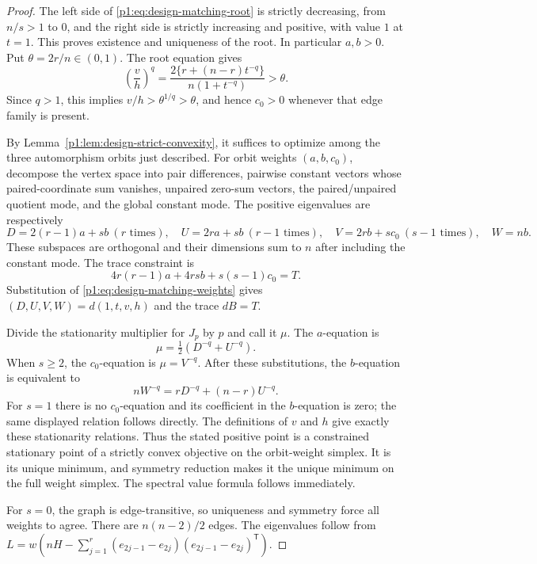 \documentclass[11pt,a4paper]{article}
\theoremstyle{definition}
\theoremstyle{remark}
\numberwithin{equation}{section}
\begin{document}
\begin{proof}
The left side of \eqref{p1:eq:design-matching-root} is strictly decreasing,
from $n/s>1$ to $0$, and the right side is strictly increasing and
positive, with value $1$ at $t=1$.  This proves existence and uniqueness
of the root.  In particular $a,b>0$.
Put $\theta=2r/n\in(0,1)$.  The root equation gives
\[
 \left(\frac vh\right)^q
 =\frac{2\{r+(n-r)t^{-q}\}}{n(1+t^{-q})}>\theta.
\]
Since $q>1$, this implies $v/h>\theta^{1/q}>\theta$,
and hence $c_0>0$ whenever that edge family is present.

By Lemma~\ref{p1:lem:design-strict-convexity}, it suffices to optimize among
the three automorphism orbits just described.  For orbit weights
$(a,b,c_0)$, decompose the vertex space into pair differences, pairwise
constant vectors whose paired-coordinate sum vanishes, unpaired zero-sum
vectors, the paired/unpaired quotient mode, and the global constant mode.
The positive eigenvalues are respectively
\[
 D=2(r-1)a+sb\ (r\text{ times}),\quad
 U=2ra+sb\ (r-1\text{ times}),\quad
 V=2rb+sc_0\ (s-1\text{ times}),\quad W=nb.
\]
These subspaces are orthogonal and their dimensions sum to $n$ after
including the constant mode.  The trace constraint is
\begin{equation}\label{p1:eq:design-matching-trace}
 4r(r-1)a+4rsb+s(s-1)c_0=T.
\end{equation}
Substitution of \eqref{p1:eq:design-matching-weights} gives
$(D,U,V,W)=d(1,t,v,h)$ and the trace $dB=T$.

Divide the stationarity multiplier for $J_p$ by $p$ and call it $\mu$.
The $a$-equation is
\[
 \mu=\tfrac12(D^{-q}+U^{-q}).
\]
When $s\ge2$, the $c_0$-equation is $\mu=V^{-q}$.
After these substitutions, the $b$-equation is equivalent to
\begin{equation}\label{p1:eq:design-matching-stationarity}
 nW^{-q}=rD^{-q}+(n-r)U^{-q}.
\end{equation}
For $s=1$ there is no $c_0$-equation and its coefficient in the
$b$-equation is zero; the same displayed relation follows directly.
The definitions of $v$ and $h$ give exactly these stationarity relations.
Thus the stated positive point is a constrained stationary point of a
strictly convex objective on the orbit-weight simplex.  It is its unique
minimum, and symmetry reduction makes it the unique minimum on the full
weight simplex.  The spectral value formula follows immediately.

For $s=0$, the graph is edge-transitive, so uniqueness and symmetry force
all weights to agree.  There are $n(n-2)/2$ edges.  The eigenvalues follow
from $L=w(nH-\sum_{j=1}^r(e_{2j-1}-e_{2j})
(e_{2j-1}-e_{2j})^{\mathsf T})$.
\end{proof}
\end{document}
